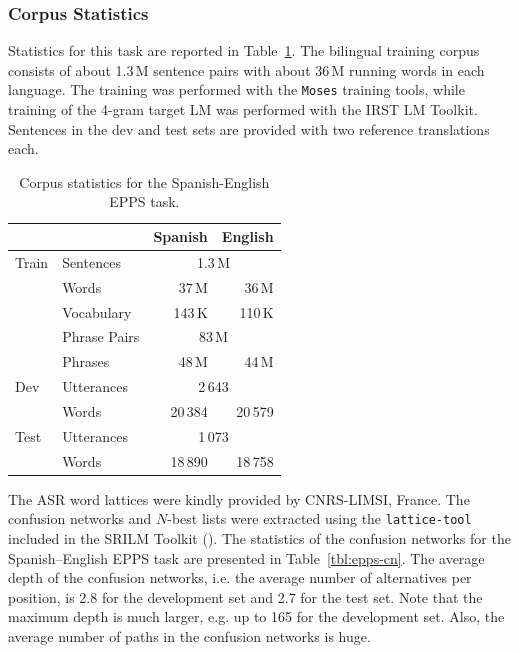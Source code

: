 \documentclass[11pt]{report}
\theoremstyle{plain}
\begin{document}
{\subsubsection{Corpus Statistics}
Statistics for this task are reported in Table~\ref{tbl:epps-corpstat}.  
The bilingual training corpus consists of about 1.3\,M sentence pairs with about 36\,M running words in each language.
The training was performed with the {\tt Moses} training tools, while training of the 4-gram target LM was performed with the IRST LM Toolkit.
Sentences in the dev and test sets are provided with two reference translations each.  
\begin{table}[t]
\begin{center}
\caption{Corpus statistics for the Spanish-English EPPS task.
} \label{tbl:epps-corpstat}
\begin{tabular}{|l|l|r|r|}
 \hline
       &              &  Spanish   &   English     \\
\hline
Train  & Sentences    & \multicolumn{2}{c|}{1.3\,M}\\
\cline{2-4}
      & Words & 37\,M & 36\,M\\
\cline{2-4}
       & Vocabulary   & 143\,K & 110\,K\\
\cline{2-4}
       & Phrase Pairs   & \multicolumn{2}{c|}{83\,M}\\
\cline{2-4}
       & Phrases   & 48\,M & 44\,M\\
 \hline
Dev    & Utterances    &   \multicolumn{2}{c|}{2\,643} \\
 \cline{2-4}
       & Words& 20\,384 & 20\,579 \\ 
 \hline
Test   & Utterances    & \multicolumn{2}{c|}{1\,073}  \\
 \cline{2-4}
       & Words& 18\,890 & 18\,758 \\
 \cline{2-4}
 \hline
\end{tabular}
\end{center}
\end{table}


The ASR word lattices  were  kindly provided by CNRS-LIMSI, France.
The confusion networks and $N$-best lists were extracted using the {\tt lattice-tool} included in the SRILM Toolkit (\cite{stolcke:02}). 
The statistics of the confusion networks for the Spanish--English EPPS task are presented in Table~\ref{tbl:epps-cn}.
The average depth of the confusion networks, i.e. the average number of alternatives per position, is 2.8 for the development set and 2.7 for the test set.
Note that the maximum depth is much larger, e.g. up to 165 for the development set.
Also, the average number of paths in the confusion networks is huge. 

}
\end{document}
